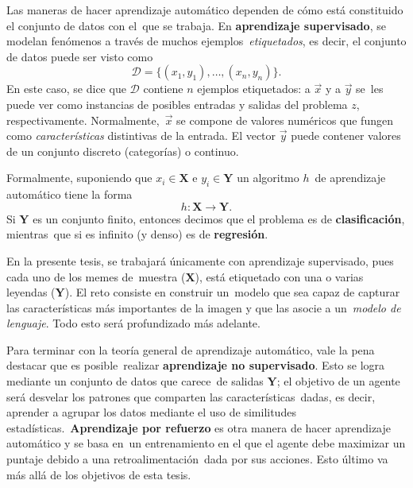 Las maneras de hacer aprendizaje automático dependen de cómo está constituido el conjunto de datos con el\
que se trabaja. En \textbf{aprendizaje supervisado}, se modelan fenómenos a través de muchos ejemplos\
\emph{etiquetados}, es decir, el conjunto de datos puede ser visto como
\begin{equation}
  \mathcal{D} = \{(x_1, y_1),\ldots,(x_n, y_n)\}.
\end{equation}
En este caso, se dice que $\mathcal{D}$ contiene $n$ ejemplos etiquetados: a $\vec{x}$ y a $\vec{y}$ se\
les puede ver como instancias de posibles entradas y salidas del problema $z$, respectivamente. Normalmente,\
$\vec{x}$ se compone de valores numéricos que fungen como \emph{características} distintivas de la entrada.
El vector $\vec{y}$ puede contener valores de un conjunto discreto (categorías) o continuo.\par
Formalmente, suponiendo que $x_i \in \mathbf{X}$ e $y_i \in \mathbf{Y}$ un algoritmo $h$\
de aprendizaje automático tiene la forma
\begin{equation}
  h: \mathbf{X} \longrightarrow \mathbf{Y}.
\end{equation}
Si $\mathbf{Y}$ es un conjunto finito, entonces decimos que el problema es de \textbf{clasificación}, mientras\
que si es infinito (y denso) es de \textbf{regresión}.\par
En la presente tesis, se trabajará únicamente con aprendizaje supervisado, pues cada uno de los memes de\
muestra ($\mathbf{X}$), está etiquetado con una o varias leyendas ($\mathbf{Y}$). El reto consiste en construir un\
modelo que sea capaz de capturar las características más importantes de la imagen y que las asocie a un\
\emph{modelo de lenguaje}. Todo esto será profundizado más adelante.\par
Para terminar con la teoría general de aprendizaje automático, vale la pena destacar que es posible\
realizar \textbf{aprendizaje no supervisado}. Esto se logra mediante un conjunto de datos que carece\
de salidas $\mathbf{Y}$; el objetivo de un agente será desvelar los patrones que comparten las características\
dadas, es decir, aprender a agrupar los datos mediante el uso de similitudes estadísticas.\
\textbf{Aprendizaje por refuerzo} es otra manera de hacer aprendizaje automático y se basa en\
un entrenamiento en el que el agente debe maximizar un puntaje debido a una retroalimentación\
dada por sus acciones. Esto último va más allá de los objetivos de esta tesis.
